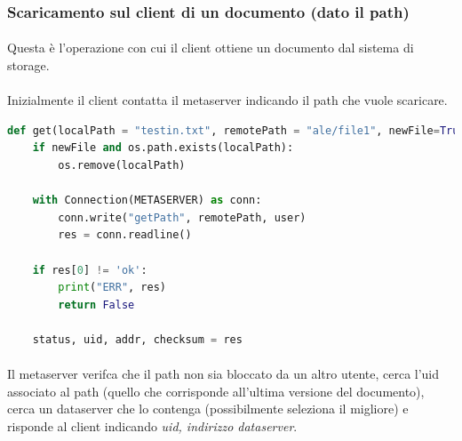 \documentclass[11pt,a4paper,english]{article}
\begin{document}
\subsubsection{Scaricamento sul client di un documento (dato il path)}

\paragraph{} Questa è l'operazione con cui il client ottiene un documento dal sistema di storage.

\paragraph{} Inizialmente il client contatta il metaserver indicando il path che vuole scaricare.

\begin{lstlisting}[language=Python, title=Client]
def get(localPath = "testin.txt", remotePath = "ale/file1", newFile=True, user="default"):
    if newFile and os.path.exists(localPath):
        os.remove(localPath)

    with Connection(METASERVER) as conn:
        conn.write("getPath", remotePath, user)
        res = conn.readline()

    if res[0] != 'ok':
        print("ERR", res)
        return False

    status, uid, addr, checksum = res
\end{lstlisting}

\paragraph{} Il metaserver verifca che il path non sia bloccato da un altro utente, cerca l'uid associato al path (quello che corrisponde all'ultima versione del documento), cerca un dataserver che lo contenga (possibilmente seleziona il migliore) e risponde al client indicando \emph{uid, indirizzo dataserver}.
\end{document}
